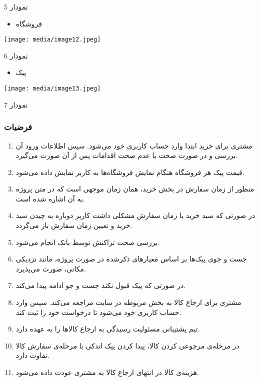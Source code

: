 \documentclass[]{article}
\begin{document}
نمودار 5

\begin{itemize}
\item
  فروشگاه
\end{itemize}

\texttt{[image: media/image12.jpeg]}

نمودار 6

\begin{itemize}
\item
  پیک
\end{itemize}

\texttt{[image: media/image13.jpeg]}

نمودار 7

\subsubsection{فرضیات}\label{ux641ux631ux636ux6ccux627ux62a}

\begin{enumerate}
\def\labelenumi{\arabic{enumi})}
\item
  مشتری برای خرید ابتدا وارد حساب کاربری خود می‌شود. سپس اطلاعات ورود آن
  بررسی و در صورت صحت یا عدم صحت اقدامات پس از آن صورت می‌گیرد.
\item
  قیمت پیک هر فروشگاه هنگام نمایش فروشگاه‌ها به کاربر نمایش داده می‌شود.
\item
  منظور از زمان سفارش در بخش خرید، همان زمان موجهی است که در متن پروژه
  به آن اشاره شده است.
\item
  در صورتی که سبد خرید یا زمان سفارش مشکلی داشت کاربر دوباره به چیدن سبد
  خرید و تعیین زمان سفارش باز می‌گردد.
\item
  بررسی صحت تراکنش توسط بانک انجام می‌شود.
\item
  جست و جوی پیک‌ها بر اساس معیارهای ذکرشده در صورت پروژه، مانند نزدیکی
  مکانی، صورت می‌پذیرد.
\item
  در صورتی که پیک قبول نکند جست و جو ادامه پیدا می‌کند.
\item
  مشتری برای ارجاع کالا به بخش مربوطه در سایت مراجعه می‌کند. سپس وارد
  حساب کاربری خود می‌شود تا درخواست خود را ثبت کند.
\item
  تیم پشتیبانی مسئولیت رسیدگی به ارجاع کالاها را به عهده دارد.
\item
  در مرحله‌ی مرجوعی کردن کالا، پیدا کردن پیک اندکی با مرحله‌ی سفارش کالا
  تفاوت دارد.
\item
  هزینه‌ی کالا در انتهای ارجاع کالا به مشتری عودت داده می‌شود.
\end{enumerate}
\end{document}
